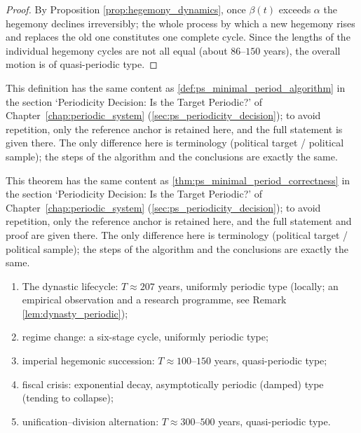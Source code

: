 \begin{proof}
By Proposition \ref{prop:hegemony_dynamics}, once $\beta(t)$ exceeds $\alpha$ the hegemony declines irreversibly; the whole process by which a new hegemony rises and replaces the old one constitutes one complete cycle. Since the lengths of the individual hegemony cycles are not all equal (about $86$--$150$ years), the overall motion is of quasi-periodic type.
\end{proof}

\begin{definition}\label{def:politics_minimal_period_algorithm}
This definition has the same content as \cref{def:ps_minimal_period_algorithm} in the section `Periodicity Decision: Is the Target Periodic?' of Chapter~\ref{chap:periodic_system} (\cref{sec:ps_periodicity_decision}); to avoid repetition, only the reference anchor is retained here, and the full statement is given there. The only difference here is terminology (political target / political sample); the steps of the algorithm and the conclusions are exactly the same.
\end{definition}

\begin{theorem}\label{thm:politics_minimal_period_correctness}
This theorem has the same content as \cref{thm:ps_minimal_period_correctness} in the section `Periodicity Decision: Is the Target Periodic?' of Chapter~\ref{chap:periodic_system} (\cref{sec:ps_periodicity_decision}); to avoid repetition, only the reference anchor is retained here, and the full statement and proof are given there. The only difference here is terminology (political target / political sample); the steps of the algorithm and the conclusions are exactly the same.
\end{theorem}

\begin{example}\label{ex:politics_periodic_examples}
\begin{enumerate}[label=(\roman*)]
    \item The dynastic lifecycle: $T\approx207$ years, uniformly periodic type (locally; an empirical observation and a research programme, see Remark \ref{lem:dynasty_periodic});
    \item regime change: a six-stage cycle, uniformly periodic type;
    \item imperial hegemonic succession: $T\approx100$--$150$ years, quasi-periodic type;
    \item fiscal crisis: exponential decay, asymptotically periodic (damped) type (tending to collapse);
    \item unification--division alternation: $T\approx300$--$500$ years, quasi-periodic type.
\end{enumerate}
\end{example}

